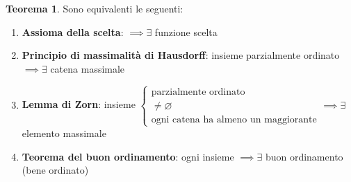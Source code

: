 \documentclass[a4paper,10pt]{article}
\theoremstyle{definition}
\theoremstyle{indentdefinition}
\theoremstyle{indentpostulate}
\theoremstyle{indenttheorem}
\newtheorem{thm}{Teorema}[section]
\theoremstyle{myremark}
\theoremstyle{indentgeneral}
\newenvironment{myboxed} 
{\noindent\begin{lrbox}{\mybox}\begin{minipage}{\textwidth}}
{\end{minipage}\end{lrbox}\fbox{\usebox{\mybox}}}
\begin{document}
\begin{myboxed}
\begin{thm}Sono equivalenti le seguenti:
\begin{enumerate}
    \item \textbf{Assioma della scelta}:  $\implies\exists$ funzione scelta
    \item \textbf{Principio di massimalità di Hausdorff}: insieme parzialmente ordinato $\implies \exists$ catena massimale 
    \item \textbf{Lemma di Zorn}: insieme $\begin{cases}
        \text{parzialmente ordinato} \\
        \ne\varnothing \\
        \text{ogni catena ha almeno un maggiorante} 
    \end{cases}\implies \exists$ elemento massimale
    \item \textbf{Teorema del buon ordinamento}: ogni insieme $\implies \exists$ buon ordinamento (bene ordinato)
\end{enumerate}
\end{thm}
\end{myboxed}
\end{document}

